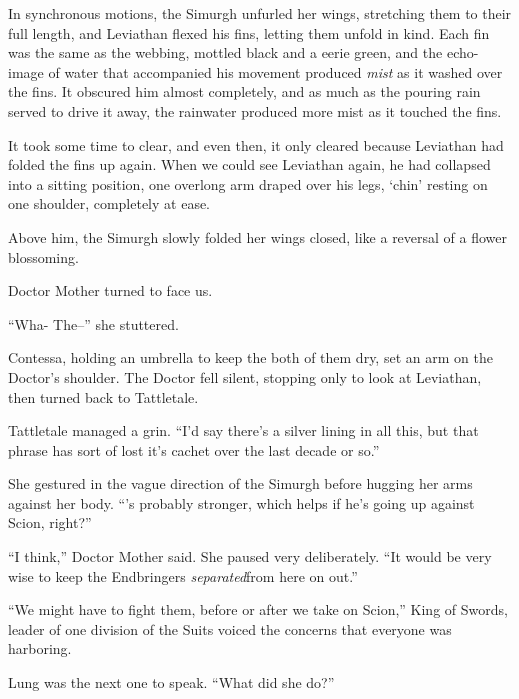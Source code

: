 In synchronous motions, the Simurgh unfurled her wings, stretching them to their full length, and Leviathan flexed his fins, letting them unfold in kind.  Each fin was the same as the webbing, mottled black and a eerie green, and the echo-image of water that accompanied his movement produced \emph{mist} as it washed over the fins.  It obscured him almost completely, and as much as the pouring rain served to drive it away, the rainwater produced more mist as it touched the fins.



It took some time to clear, and even then, it only cleared because Leviathan had folded the fins up again.  When we could see Leviathan again, he had collapsed into a sitting position, one overlong arm draped over his legs, `chin' resting on one shoulder, completely at ease.



Above him, the Simurgh slowly folded her wings closed, like a reversal of a flower blossoming.



Doctor Mother turned to face us.



``Wha-  The--'' she stuttered.



Contessa, holding an umbrella to keep the both of them dry, set an arm on the Doctor's shoulder.  The Doctor fell silent, stopping only to look at Leviathan, then turned back to Tattletale.



Tattletale managed a grin.  ``I'd say there's a silver lining in all this, but that phrase has sort of lost it's cachet over the last decade or so.''



She gestured in the vague direction of the Simurgh before hugging her arms against her body.  ``\ldotsHe's probably stronger, which helps if he's going up against Scion, right?''



``I think,'' Doctor Mother said.  She paused very deliberately.  ``It would be very wise to keep the Endbringers \emph{separated}from here on out.''



``We might have to fight them, before or after we take on Scion,'' King of Swords, leader of one division of the Suits voiced the concerns that everyone was harboring.



Lung was the next one to speak.  ``What did she do?''



